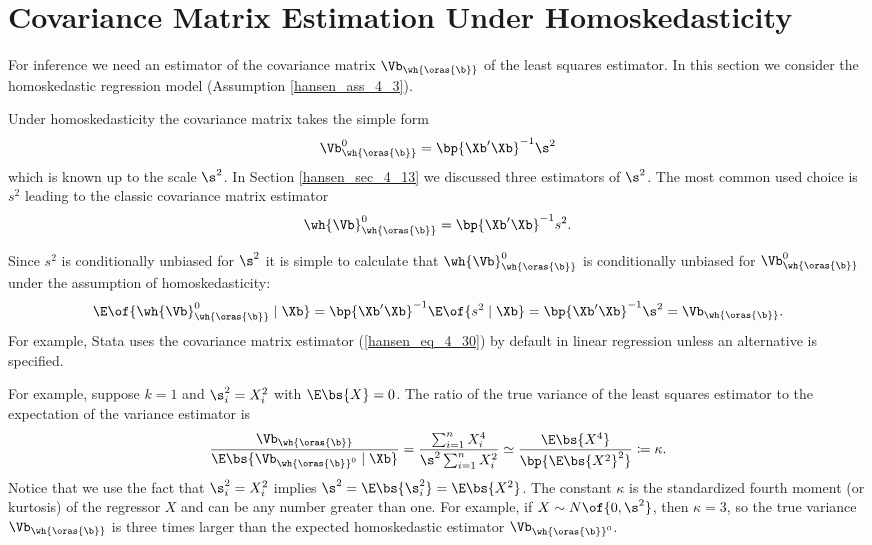 \section{Covariance Matrix Estimation Under Homoskedasticity}

For inference we need an estimator of the covariance matrix $\Vb_{\wh{\oras{\b}}}$ of the least squares estimator. In this section we consider the homoskedastic regression model (Assumption \ref{hansen_ass_4_3}).

Under homoskedasticity the covariance matrix takes the simple form
\begin{equation}
    \notag
    \Vb_{\wh{\oras{\b}}}^0 = \bp{\Xb^\prime \Xb}^{-1} \s^2
\end{equation}
which is known up to the scale $\s^2$. In Section \ref{hansen_sec_4_13} we discussed three estimators of $\s^2$. The most common used choice is $s^2$ leading to the classic covariance matrix estimator
\begin{equation}
    \label{hansen_eq_4_30}
    \wh{\Vb}_{\wh{\oras{\b}}}^0 = \bp{\Xb^\prime \Xb}^{-1} s^2 .
\end{equation}

Since $s^2$ is conditionally unbiased for $\s^2$ it is simple to calculate that $\wh{\Vb}_{\wh{\oras{\b}}}^0$ is conditionally unbiased for $\Vb_{\wh{\oras{\b}}}^0$ under the assumption of homoskedasticity:
\begin{equation}
    \notag
    \E\of{\wh{\Vb}_{\wh{\oras{\b}}}^0 \mid \Xb} = \bp{\Xb^\prime \Xb}^{-1} \E\of{s^2 \mid \Xb} = \bp{\Xb^\prime \Xb}^{-1} \s^2 = \Vb_{\wh{\oras{\b}}}.
\end{equation}
 For example, Stata uses the covariance matrix estimator (\ref{hansen_eq_4_30}) by default in linear regression unless an alternative is specified.


For example, suppose $k=1$ and $\s_i^2 = X_i^2$ with $\E\bs{X} = 0$. The ratio of the true variance of the least squares estimator to the expectation of the variance estimator is 
\begin{equation}
    \notag
    \frac{\Vb_{\wh{\oras{\b}}}}{\E\bs{\Vb_{\wh{\oras{\b}}^0} \mid \Xb}} = \frac{\sum_{i=1}^{n}X_i^4}{\s^2 \sum_{i=1}^{n} X_i^2} \simeq \frac{\E\bs{X^4}}{\bp{\E\bs{X^2}^2}} \coloneqq \kappa.
\end{equation}
Notice that we use the fact that $\s_i^2 = X_i^2$ implies $\s^2 = \E\bs{\s_i^2} = \E\bs{X^2}$. The constant $\kappa$ is the standardized fourth moment (or kurtosis) of the regressor $X$ and can be any number greater than one. For example, if $X \sim N\of{0, \s^2}$, then $\kappa=3$, so the true variance $\Vb_{\wh{\oras{\b}}}$ is three times larger than the expected homoskedastic estimator $\Vb_{\wh{\oras{\b}}^0}$.

